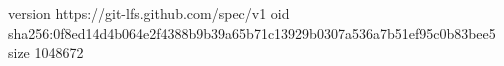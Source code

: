 version https://git-lfs.github.com/spec/v1
oid sha256:0f8ed14d4b064e2f4388b9b39a65b71c13929b0307a536a7b51ef95c0b83bee5
size 1048672
